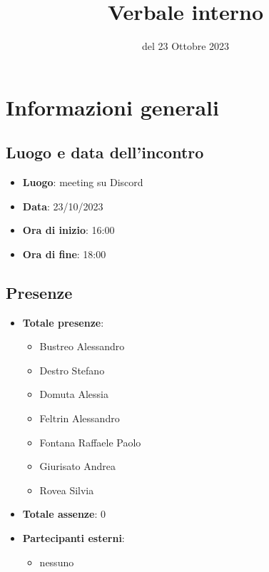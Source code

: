 \documentclass[12pt]{article}
\title{Verbale interno}
\date{del 23 Ottobre 2023}
\begin{document}
	\makefirstpage
	
	
	\clearpage
	
	\tableofcontents
	\clearpage

    \section{Informazioni generali}
    
    \subsection{Luogo e data dell'incontro}
    
    \begin{itemize}
    	\item \textbf{Luogo}: meeting su Discord
    	\item \textbf{Data}: 23/10/2023
    	\item \textbf{Ora di inizio}: 16:00
    	\item \textbf{Ora di fine}: 18:00
    \end{itemize}
    
    \subsection{Presenze}
    
    \begin{itemize}
    	\item \textbf{Totale presenze}:
    	\begin{itemize}
    		\item Bustreo Alessandro
    		\item Destro Stefano
    		\item Domuta Alessia 
    		\item Feltrin Alessandro 
    		\item Fontana Raffaele Paolo 
    		\item Giurisato Andrea 
    		\item Rovea Silvia
    	\end{itemize}
    	
    	\item \textbf{Totale assenze}: 0
    	
    	\item \textbf{Partecipanti esterni}:
    	\begin{itemize}
    		\item nessuno
    	\end{itemize}
    \end{itemize}
    
\end{document}
